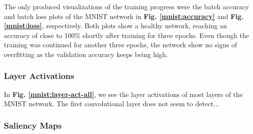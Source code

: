 The only produced visualizations of the training progress were the batch accuracy and batch loss plots of the MNIST network in \textbf{Fig. \ref{mnist:accuracy}} and \textbf{Fig. \ref{mnist:loss}}, respectively. Both plots show a healthy network, reaching an accuracy of close to 100\% shortly after training for three epochs. Even though the training was continued for another three epochs, the network show no signs of overfitting as the validation accuracy keeps being high. 


\subsubsection{Layer Activations}

In \textbf{Fig. \ref{mnist:layer-act-all}}, we see the layer activations of most layers of the MNIST network. The first convolutional layer does not seem to detect...

\begin{comment}
FIG. 1.5:
- We see that the first convolutional layer do not find any specific features
- It is not until the second convolutional layer that we see features in terms of edges.
- Fc 3: the network is 100\% certain that it is class 0.

FIG. 1.6:
- Shows conv2 at 1, 5 and 10.

Each square in the montage of activations is the output of a channel in the conv1 layer. White pixels represent strong positive activations and black pixels represent strong negative activations. A channel that is mostly gray does not activate as strongly on the input image. The position of a pixel in the activation of a channel corresponds to the same position in the original image. A white pixel at some location in a channel indicates that the channel is strongly activated at that position.

This technique can be used to determine what kinds of features a convolutional network learns at each layer of the network. 

One dangerous pitfall that can be easily noticed with this visualization is that some activation maps may be all zero for many different inputs, which can indicate dead filters, and can be a symptom of high learning rates.
--> ikke mulig å se flere inputs samtidig

\end{comment}

\subsubsection{Saliency Maps}

